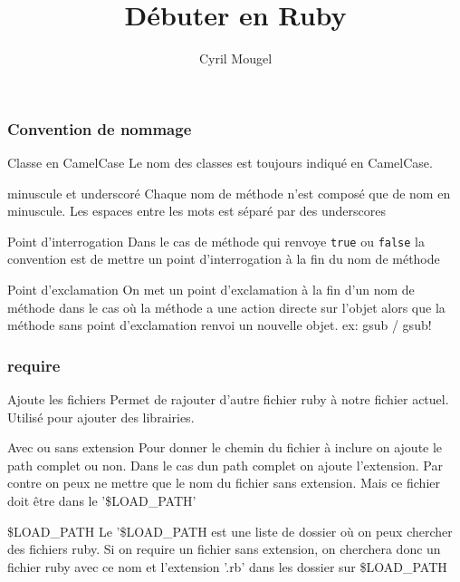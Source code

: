\documentclass{beamer}
\title{D\'ebuter en Ruby}
\author{Cyril Mougel}
\begin{document}
\begin{frame}
  \titlepage
\end{frame}

\begin{frame}
  \frametitle{Convention de nommage}
  \begin{block}{Classe en CamelCase}
    Le nom des classes est toujours indiqu\'e en CamelCase.
  \end{block}
  \begin{block}{minuscule et underscor\'e}
    Chaque nom de m\'ethode n'est compos\'e que de nom en minuscule. Les espaces entre les mots est s\'epar\'e par des underscores
  \end{block}
\end{frame}

\begin{frame}
  \begin{block}{Point d'interrogation}
    Dans le cas de m\'ethode qui renvoye \verb?true? ou \verb?false? la convention est de mettre un point d'interrogation à la fin du nom de m\'ethode
  \end{block}
  \begin{block}{Point d'exclamation}
    On met un point d'exclamation à la fin d'un nom de m\'ethode dans le cas où la m\'ethode a une action directe sur l'objet alors que la m\'ethode sans point d'exclamation renvoi un nouvelle objet. ex: gsub / gsub!
  \end{block}
\end{frame}

\begin{frame}
  \frametitle{require}
  \begin{block}{Ajoute les fichiers}
    Permet de rajouter d'autre fichier ruby à notre fichier actuel. Utilis\'e pour ajouter des librairies.
  \end{block}
  \begin{block}{Avec ou sans extension}
    Pour donner le chemin du fichier à inclure on ajoute le path complet ou non. Dans le cas dun path complet on ajoute l'extension. Par contre on peux ne mettre que le nom du fichier sans extension. Mais ce fichier doit être dans le '\$LOAD\_PATH'
  \end{block}
  \begin{block}{\$LOAD\_PATH}
    Le '\$LOAD\_PATH est une liste de dossier où on peux chercher des fichiers ruby. Si on require un fichier sans extension, on cherchera donc un fichier ruby avec ce nom et l'extension '.rb' dans les dossier sur \$LOAD\_PATH
  \end{block}
\end{frame}
\end{document}
